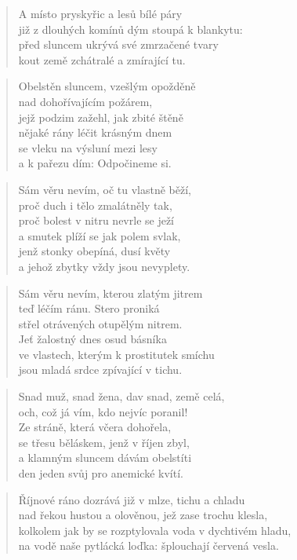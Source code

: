 \documentclass{book}
\begin{document}
\begin{verse}
A místo pryskyřic a lesů bílé páry\\
již z dlouhých komínů dým stoupá k blankytu:\\
před sluncem ukrývá své zmrzačené tvary\\
kout země zchátralé a zmírající tu.
\end{verse}
\newpage
{}
\begin{verse}
Obelstěn sluncem, vzešlým opožděně\\
nad dohořívajícím požárem,\\
jejž podzim zažehl, jak zbité štěně\\
nějaké rány léčit krásným dnem\\
se vleku na výsluní mezi lesy\\
a k pařezu dím: Odpočineme si.
\end{verse}
\begin{verse}
Sám věru nevím, oč tu vlastně běží,\\
proč duch i tělo zmalátněly tak,\\
proč bolest v nitru nevrle se ježí\\
a smutek plíží se jak polem svlak,\\
jenž stonky obepíná, dusí květy\\
a jehož zbytky vždy jsou nevyplety.
\end{verse}
\begin{verse}
Sám věru nevím, kterou zlatým jitrem\\
teď léčím ránu. Stero proniká\\
střel otrávených otupělým nitrem.\\
Jeť žalostný dnes osud básníka\\
ve vlastech, kterým k prostitutek smíchu\\
jsou mladá srdce zpívající v tichu.
\end{verse}
\begin{verse}
Snad muž, snad žena, dav snad, země celá,\\
och, což já vím, kdo nejvíc poranil!\\
Ze stráně, která včera dohořela,\\
se třesu běláskem, jenž v říjen zbyl,\\
a klamným sluncem dávám obelstíti\\
den jeden svůj pro anemické kvítí.
\end{verse}
\newpage
{}
\begin{verse}
Říjnové ráno dozrává již v mlze, tichu a chladu\\
nad řekou hustou a olověnou, jež zase trochu klesla,\\
kolkolem jak by se rozptylovala voda v dychtivém hladu,\\
na vodě naše pytlácká loďka: šplouchají červená vesla.
\end{verse}
\end{document}
